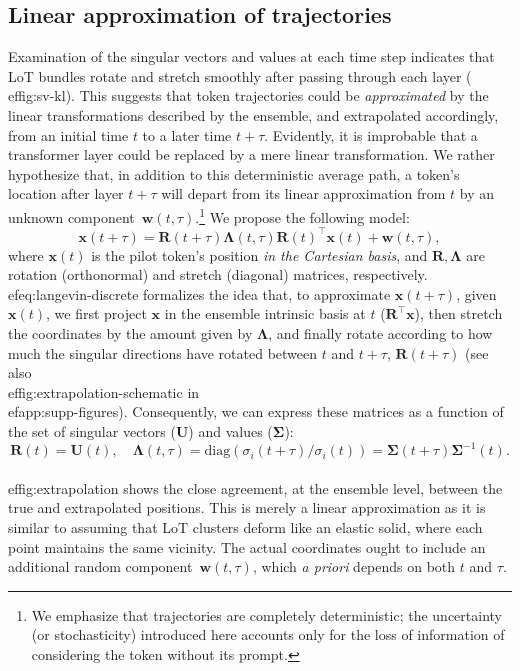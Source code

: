 \documentclass{article} %
\def\rvw{{\mathbf{w}}}
\def\vw{{\bm{w}}}
\def\vx{{\bm{x}}}
\def\mR{{\bm{R}}}
\def\mU{{\bm{U}}}
\begin{document}
\subsection{Linear approximation of trajectories}
Examination of the singular vectors and values at each time step indicates that LoT bundles rotate and stretch smoothly after passing through each layer (\\ef{fig:sv-kl}).
This suggests that token trajectories could be \emph{approximated} by the linear transformations described by the ensemble, and extrapolated accordingly, from an initial time $t$ to a later time $t+\tau$.
Evidently, it is improbable that a transformer layer could be replaced by a mere linear transformation.
We rather hypothesize that, in addition to this deterministic average path, a token's location after layer $t+\tau$ will depart from its linear approximation from $t$ by an unknown component~$\vw(t,\tau)$.\footnote{
We emphasize that trajectories are completely deterministic; the uncertainty (or stochasticity) introduced here accounts only for the loss of information of considering the token without its prompt.}
We propose the following model:
\begin{equation} \label{eq:langevin-discrete}
    \vx(t + \tau) = \mR(t+\tau) \mathbf{\Lambda}(t,\tau) \mR(t)^{\top} \vx(t) + \vw(t,\tau),
\end{equation}
where $\vx(t)$ is the pilot token's position \textit{in the Cartesian basis}, and $\mR, \mathbf{\Lambda}$ are rotation (orthonormal) and stretch (diagonal) matrices, respectively. 
\\ef{eq:langevin-discrete} formalizes the idea that, to approximate $\vx(t+\tau)$, given $\vx(t)$, we first project $\vx$ in the ensemble intrinsic basis at $t$ ($\mR^{\top} \vx$), then stretch the coordinates by the amount given by $\mathbf{\Lambda}$, and finally rotate according to how much the singular directions have rotated between $t$ and $t+\tau$, $\mR(t+\tau)$ (see also \\ef{fig:extrapolation-schematic} in \\ef{app:supp-figures}). Consequently, we can express these matrices as a function of the set of singular vectors ($\mU$) and values ($\mathbf{\Sigma}$):
\[
    \mR(t) = \mU(t), 
    \quad 
    \mathbf{\Lambda}(t,\tau) = \text{diag}(\sigma_i(t+\tau)/\sigma_i(t)) = \mathbf{\Sigma}(t+\tau) \mathbf{\Sigma}^{-1}(t).
\]
\\ef{fig:extrapolation} shows the close agreement, at the ensemble level, between the true and extrapolated positions. This is merely a linear approximation as it is similar to assuming that LoT clusters deform like an elastic solid, where each point maintains the same vicinity. 
The actual coordinates ought to include an additional random component~$\rvw(t,\tau)$, which \textit{a priori} depends on both $t$ and $\tau$.
\end{document}
